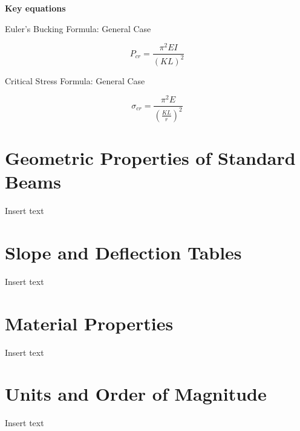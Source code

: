 \documentclass[
  letterpaper,
  DIV=11,
  numbers=noendperiod]{scrreprt}
\theoremstyle{definition}
\theoremstyle{remark}
\begin{document}
\begin{tcolorbox}[enhanced jigsaw, leftrule=.75mm, colbacktitle=quarto-callout-note-color!10!white, breakable, opacityback=0, colback=white, titlerule=0mm, toprule=.15mm, colframe=quarto-callout-note-color-frame, coltitle=black, title={Note}, toptitle=1mm, bottomrule=.15mm, rightrule=.15mm, left=2mm, arc=.35mm, opacitybacktitle=0.6, bottomtitle=1mm]

\textbf{Key equations}

Euler's Bucking Formula: General Case

\[
P_{c r}=\frac{\pi^2 E I}{(K L)^2}
\]

Critical Stress Formula: General Case

\[
\sigma_{c r}=\frac{\pi^2 E}{\left(\frac{K L}{r}\right)^2}
\]

\end{tcolorbox}

\cleardoublepage
{}
{}
\appendix

\chapter{Geometric Properties of Standard
Beams}\label{geometric-properties-of-standard-beams}

Insert text

\chapter{Slope and Deflection Tables}\label{slope-and-deflection-tables}

Insert text

\chapter{Material Properties}\label{material-properties}

Insert text

\chapter{Units and Order of
Magnitude}\label{units-and-order-of-magnitude}

Insert text
\end{document}
